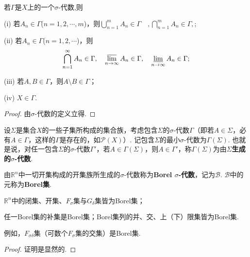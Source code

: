 \documentclass[../../main.tex]{subfiles}
\begin{document}
\begin{proposition}\label{proposition:σ-代数的基本性质}
若$\Gamma$是$X$上的一个$\sigma$-代数,则

(i) 若$A_n\in\Gamma$($n = 1,2,\cdots,m$)，则$\bigcup_{n = 1}^{m}A_n\in\Gamma\quad ,\bigcap_{n = 1}^{m}A_n\in\Gamma, $;

(ii) 若$A_n\in\Gamma$($n = 1,2,\cdots$)，则
\begin{align*}
\bigcap_{n = 1}^{\infty}A_n\in\Gamma, \quad \varlimsup_{n\to\infty}A_n\in\Gamma, \quad \varliminf_{n\to\infty}A_n\in\Gamma;
\end{align*}

(iii) 若$A,B\in\Gamma$，则$A\setminus B\in\Gamma$；

(iv) $X\in\Gamma$. 
\end{proposition}
\begin{proof}
由$\sigma$-代数的定义立得.
\end{proof}

\begin{definition}[生成$\sigma$-代数]
设$\Sigma$是集合$X$的一些子集所构成的集合族，考虑包含$\Sigma$的$\sigma$-代数$\Gamma$（即若$A\in\Sigma$，必有$A\in\Gamma$，这样的$\Gamma$是存在的，如$\mathcal{P}(X)$）. 记包含$\Sigma$的最小$\sigma$-代数为$\Gamma(\Sigma)$. 也就是说，对任一包含$\Sigma$的$\sigma$-代数$\Gamma'$，若$A\in\Gamma(\Sigma)$，则$A\in\Gamma'$，称$\Gamma(\Sigma)$为由\textbf{$\Sigma$生成的$\sigma$-代数}.
\end{definition}

\begin{definition}[Borel集]\label{definition:Borel集}
由$\mathbb{R}^n$中一切开集构成的开集族所生成的$\sigma$-代数称为\textbf{Borel $\sigma$-代数}，记为$\mathscr{B}$. $\mathscr{B}$中的元称为\textbf{Borel集}.
\end{definition}

\begin{proposition}[Borel集的基本性质]\label{proposition:Borel集的基本性质}
$\mathbb{R}^n$中的闭集、开集、$F_{\sigma}$集与$G_{\delta}$集皆为Borel集；

任一Borel集的补集是Borel集；Borel集列的并、交、上（下）限集皆为Borel集. 
\end{proposition}
\begin{note}
例如，$F_{\sigma\delta}$集（可数个$F_{\sigma}$集的交集）是Borel集.
\end{note}
\begin{proof}
证明是显然的.
\end{proof}
\end{document}
